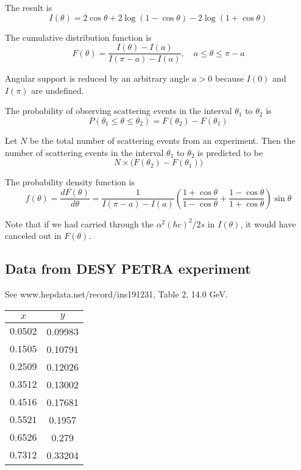 \documentclass[12pt]{article}
\begin{document}
The result is
\begin{equation*}
I(\theta)=2\cos\theta+2\log(1-\cos\theta)-2\log(1+\cos\theta)
\end{equation*}

The cumulative distribution function is
\begin{equation*}
F(\theta)=\frac{I(\theta)-I(a)}{I(\pi-a)-I(a)},
\quad
a\le\theta\le\pi-a
\end{equation*}

Angular support is reduced by an arbitrary angle $a>0$ because $I(0)$ and $I(\pi)$ are undefined.

\bigskip
The probability of observing scattering events in the interval
$\theta_1$ to $\theta_2$ is
\begin{equation*}
P(\theta_1\le\theta\le\theta_2)=F(\theta_2)-F(\theta_1)
\end{equation*}

Let $N$ be the total number of scattering events from an experiment.
Then the number of scattering events in the interval $\theta_1$
to $\theta_2$ is predicted to be
$$
N\times\bigl(F(\theta_2)-F(\theta_1)\bigr)
$$

The probability density function is
$$
f(\theta)=\frac{dF(\theta)}{d\theta}
=\frac{1}{I(\pi-a)-I(a)}
\left(\frac{1+\cos\theta}{1-\cos\theta}+\frac{1-\cos\theta}{1+\cos\theta}\right)
\sin\theta
$$

Note that if we had carried through the $\alpha^2(\hbar c)^2/2s$ in $I(\theta)$,
it would have canceled out in $F(\theta)$.

\subsection*{Data from DESY PETRA experiment}
See www.hepdata.net/record/ins191231, Table 2, 14.0 GeV.

\begin{center}
\begin{tabular}{|c|c|}
\hline
$x$ & $y$\\
\hline
$0.0502$ & 0.09983\\
$0.1505$ & 0.10791\\
$0.2509$ & 0.12026\\
$0.3512$ & 0.13002\\
$0.4516$ & 0.17681\\
$0.5521$ & 0.1957\phantom{0}\\
$0.6526$ & 0.279\phantom{00}\\
$0.7312$ & 0.33204\\
\hline
\end{tabular}
\end{center}
\end{document}

